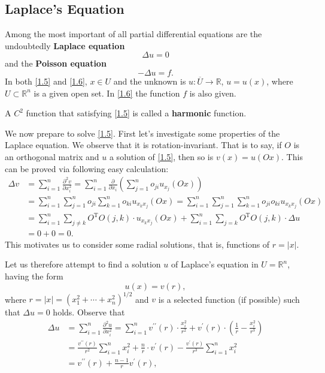 \subsection{Laplace's Equation}\label{Sec1.2}
Among the most important of all partial differential equations are the undoubtedly \textbf{Laplace equation}
\begin{equation}\label{1.5}
\Delta u=0
\end{equation}
and the \textbf{Poisson equation}
\begin{equation}\label{1.6}
-\Delta u=f.
\end{equation}
In both \eqref{1.5} and \eqref{1.6}, $x\in U$ and the unknown is $u:\overline{U}\to\mathbb{R}$, $u=u(x)$, where $U\subset\mathbb{R}^n$ is a given open set. In \eqref{1.6} the function $f$ is also given.
\begin{definition}
A $C^2$ function that satisfying \eqref{1.5} is called a \textbf{harmonic} function.
\end{definition}
We now prepare to solve \eqref{1.5}. First let's investigate some properties of the Laplace equation. We observe that it is rotation-invariant. That is to say, if $O$ is an orthogonal matrix and $u$ a solution of \eqref{1.5}, then so is $v(x)=u(Ox)$. This can be proved via following easy calculation: 
$$
\begin{aligned}
\Delta v&=\sum_{i=1}^n{\frac{\partial ^2v}{\partial x_{i}^{2}}}=\sum_{i=1}^n{\frac{\partial}{\partial x_i}\left( \sum_{j=1}^n{o_{ji}u_{x_j}\left( Ox \right)} \right)}
\\
&=\sum_{i=1}^n{\sum_{j=1}^n{o_{ji}\sum_{k=1}^n{o_{ki}u_{x_kx_j}\left( Ox \right)}}}=\sum_{i=1}^n{\sum_{j=1}^n{\sum_{k=1}^n{o_{ji}o_{ki}u_{x_kx_j}\left( Ox \right)}}}
\\
&=\sum_{i=1}^n{\sum_{j\ne k}{O^{\mathrm{T}}O\left( j,k \right) \cdot u_{x_kx_j}\left( Ox \right)}}+\sum_{i=1}^n{\sum_{j=k}{O^{\mathrm{T}}O\left( j,k \right) \cdot \Delta u}}
\\
&=0+0=0.
\end{aligned}
$$
This motivates us to consider some radial solutions, that is, functions of $r=|x|$.\par
Let us therefore attempt to find a solution $u$ of Laplace's equation in $U=\mathbb{R}^n$, having the form 
$$u(x)=v(r),$$
where $r=|x|=(x_1^2+\cdots+x_n^2)^{1/2}$ and $v$ is a selected function (if possible) such that $\Delta u=0$ holds. Observe that 
$$
\begin{aligned}
\Delta u&=\sum_{i=1}^n{\frac{\partial ^2u}{\partial x_{i}^{2}}}=\sum_{i=1}^n{v^{\prime\prime}\left( r \right) \cdot \frac{x_{i}^{2}}{r^2}+v^{\prime}\left( r \right) \cdot \left( \frac{1}{r}-\frac{x_{i}^{2}}{r^3} \right)}
\\
&=\frac{v^{\prime\prime}\left( r \right)}{r^2}\sum_{i=1}^n{x_{i}^{2}}+\frac{n}{r}\cdot v^{\prime}\left( r \right) -\frac{v^{\prime}\left( r \right)}{r^3}\sum_{i=1}^n{x_{i}^{2}}
\\
&=v^{\prime\prime}\left( r \right) +\frac{n-1}{r}v^{\prime}\left( r \right) ,
\end{aligned}
$$
